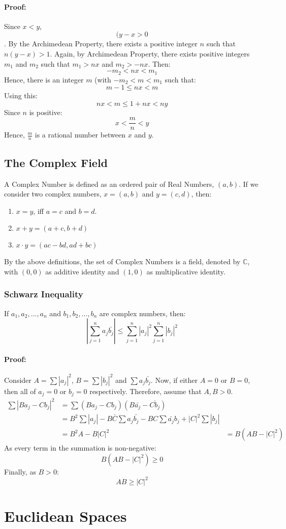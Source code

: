 \documentclass[12pt, oneside]{book}
\begin{document}
\paragraph{Proof:} Since \(x<y\), \[(y-x > 0\].
By the Archimedean Property, there exists a positive integer \(n\) such that \(n(y-x) > 1\).
Again, by Archimedean Property, there exists positive integers \(m_1\) and \(m_2\) such that \(m_1 > nx\) and \(m_2 > -nx\).
Then: \[ -m_2 < nx < m_1 \]
Hence, there is an integer \(m\) (with \( -m_2 < m < m_1 \) such that:
\[ m-1 \leq nx < m \]
Using this:
\[ nx < m \leq 1+nx <ny \]
Since \(n\) is positive:
\[ x < \frac{m}{n} < y \]
Hence, \(\frac{m}{n}\) is a rational number between \(x\) and \(y\).

\subsection{The Complex Field}
A Complex Number is defined as an ordered pair of Real Numbers, \((a,b)\).
If we consider two complex numbers, \(x=(a,b)\) and \(y=(c,d)\), then:
\begin{enumerate}
	\item \(x = y\), iff \(a=c\) and \(b=d\).
	\item \(x+y = (a+c,b+d)\)
	\item \(x \cdot y = (ac-bd,ad+bc)\)
\end{enumerate}
By the above definitions, the set of Complex Numbers is a field, denoted by \(\mathbb{C}\), with \((0,0)\) as additive identity and \((1,0)\) as multiplicative identity.

\subsubsection{Schwarz Inequality}
If \( a_1, a_2, \dots, a_n \) and \( b_1, b_2, \dots, b_n \) are complex numbers, then:
\[ \left| \sum_{j=1}^{n} a_j \bar{b_j} \right| \leq \sum_{j=1}^{n} \left|a_j\right|^2 \sum_{j=1}^{n} \left|b_j\right|^2 \]

\paragraph{Proof:} Consider \(A = \sum |a_j|^2 \), \(B = \sum |b_j|^2\) and \(\sum a_j \bar{b_j}\).
Now, if either \(A=0\) or \(B=0\), then all of \(a_j=0\) or \(b_j=0\) respectively.
Therefore, assume that \(A,B>0\).
\begin{align*}
	\sum \left| Ba_j - Cb_j \right|^2 & = \sum \left( Ba_j - Cb_j \right)\left( B \bar{a_j} - \bar{Cb_j} \right)                                                   \\
	                                  & = B^2 \sum \left|a_j\right| - B\bar{C} \sum a_j \bar{b_j} - BC \sum \bar{a_j} b_j + \left|C\right|^2 \sum \left|b_j\right| \\
	                                  & = B^2 A - B\left|C\right|^2
	                                  & = B\left(AB - \left|C\right|^2\right)
\end{align*}
As every term in the summation is non-negative:
\[B\left(AB - |C|^2\right) \geq 0\]
Finally, as \(B>0\):
\[ AB \geq |C|^2\]

\section{Euclidean Spaces}
\end{document}
